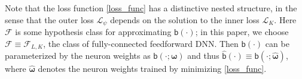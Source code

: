 \documentclass{article}
\def\calF{\mathcal{F}}
\def\sfb{\mathsf{b}}
\def\sfb{\mathsf{b}}
\theoremstyle{plain}
\theoremstyle{definition}
\theoremstyle{remark}
\def\diff{\mathrm{d}}
\def\bbeta{\boldsymbol{\beta}}
\def\hat{\widehat}
\def\tilde{\widetilde}
\begin{document}

Note that the loss function \eqref{loss_func} has a distinctive nested structure, in the sense that the outer loss $\mathcal{L}_{\psi}$ depends on the solution to the inner loss $\mathcal{L}_{K}$. Here $\calF$ is some hypothesis class for approximating $\sfb (\cdot)$; in this paper, we choose $\calF \equiv \calF_{L, K}$, the class of fully-connected feedforward DNN. Then $\sfb (\cdot)$ can be parameterized by the neuron weights as $\sfb (\cdot; \bm{\omega})$ and thus $\hat{\sfb} (\cdot) \equiv \sfb (\cdot; \hat{\bm{\omega}})$, where $\hat{\bm{\omega}}$ denotes the neuron weights trained by minimizing \eqref{loss_func}.
\end{document}
